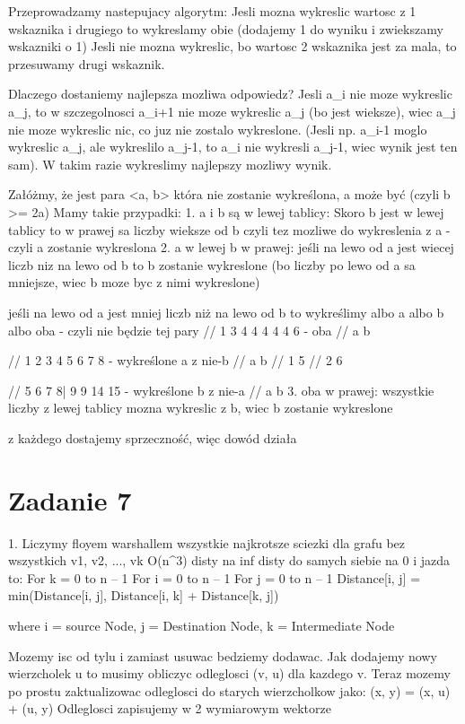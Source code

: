 \documentclass[12pt]{article}
\begin{document}
Przeprowadzamy nastepujacy algorytm:
Jesli mozna wykreslic wartosc z 1 wskaznika i drugiego to wykreslamy obie (dodajemy 1 do wyniku i zwiekszamy wskazniki o 1)
Jesli nie mozna wykreslic, bo wartosc 2 wskaznika jest za mala, to przesuwamy drugi wskaznik.


Dlaczego dostaniemy najlepsza mozliwa odpowiedz?
Jesli a_i nie moze wykreslic a_j, to w szczegolnosci a_i+1 nie moze wykreslic a_j (bo jest wieksze), wiec a_j nie moze wykreslic nic, co juz nie zostalo wykreslone. (Jesli np. a_i-1 moglo wykreslic a_j, ale wykreslilo a_j-1, to a_i nie wykresli a_j-1, wiec wynik jest ten sam).
W takim razie wykreslimy najlepszy mozliwy wynik.


Załóżmy, że jest para <a, b> która nie zostanie wykreślona, a może być (czyli b >= 2a)
Mamy takie przypadki:
1. a i b są w lewej tablicy:
Skoro b jest w lewej tablicy to w prawej sa liczby wieksze od b czyli tez mozliwe do wykreslenia z a - czyli a zostanie wykreslona
2. a w lewej b w prawej:
jeśli na lewo od a jest wiecej liczb niz na lewo od b to b zostanie wykreslone (bo liczby po lewo od a sa mniejsze, wiec b moze byc z nimi wykreslone) 

jeśli na lewo od a jest mniej liczb niż na lewo od b 
to wykreślimy albo a albo b albo oba - czyli nie będzie tej pary 
// 1 3 4 4 4 4 4 6 - oba
//   a           b  

// 1 2 3 4 5 6 7 8 - wykreślone a z nie-b 
//   a         b 
// 1 5 
// 2 6 

// 5 6 7 8| 9 9 14 15 - wykreślone b z nie-a 
//   a           b 
3. oba w prawej:
wszystkie liczby z lewej tablicy mozna wykreslic z b, wiec b zostanie wykreslone


z każdego dostajemy sprzeczność, więc dowód działa

\section{Zadanie 7}
1. Liczymy floyem warshallem wszystkie najkrotsze sciezki dla grafu bez wszystkich v1, v2, ..., vk O(n^3)
disty na inf 
disty do samych siebie na 0 
i jazda to:
For k = 0 to n – 1
For i = 0 to n – 1
For j = 0 to n – 1
Distance[i, j] = min(Distance[i, j], Distance[i, k] + Distance[k, j])

where i = source Node, j = Destination Node, k = Intermediate Node


Mozemy isc od tylu i zamiast usuwac bedziemy dodawac.
Jak dodajemy nowy wierzcholek u to musimy obliczyc odleglosci (v, u) dla kazdego v. Teraz mozemy po prostu zaktualizowac odleglosci do starych wierzcholkow jako:
(x, y) = (x, u) + (u, y)
Odleglosci zapisujemy w 2 wymiarowym wektorze
\end{document}
